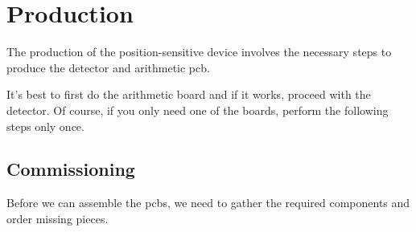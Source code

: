 \section{Production}

The production of the position-sensitive device involves the necessary steps to produce the detector and arithmetic \gls{pcb}.

It's best to first do the arithmetic board and if it works, proceed with the detector.
Of course, if you only need one of the boards, perform the following steps only once.

\subsection{Commissioning}


Before we can assemble the \gls{pcb}s, we need to gather the required components and order missing pieces.

